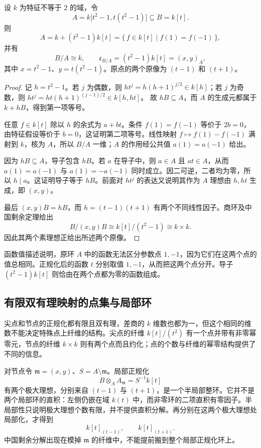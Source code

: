 \begin{proposition}\label{b3:prop:node-conductor}
	设 \(k\) 为特征不等于 \(2\) 的域，令
	\[
		A=k\bigl[t^2-1,t(t^2-1)\bigr]\subseteq B=k[t].
	\]
	则
	\[
		A=k+(t^2-1)k[t] =\bigl\{\,f\in k[t]\mid f(1)=f(-1)\,\bigr\},
	\]
	并有
	\[
		B/A\cong k,\qquad \mathfrak c_{B/A}=(t^2-1)k[t]=(x,y)_A,
	\]
	其中 \(x=t^2-1\)、\(y=t(t^2-1)\)。原点的两个原像为 \((t-1)\) 和 \((t+1)\)。
\end{proposition}
\begin{proof}
	记 \(h=t^2-1\)。若 \(j\) 为偶数，则 \(ht^j=h(h+1)^{j/2}\in k[h]\)；若 \(j\) 为奇数，则 \(ht^j=ht(h+1)^{(j-1)/2}\in k[h,ht]\)。 故 \(hB\subseteq A\)，而 \(A\) 的生成元都属于 \(k+hB\)，得到第一项等号。

	任意 \(f\in k[t]\) 除以 \(h\) 的余式为 \(a+bt\)。条件 \(f(1)=f(-1)\) 等价于 \(2b=0\)，由特征假设等价于 \(b=0\)，这证明第二项等号。线性映射 \(f\mapsto f(1)-f(-1)\) 满射到 \(k\)，核为 \(A\)，所以 \(B/A\) 一维；\(A\) 的作用经公共值 \(a(1)=a(-1)\) 给出。

	因为 \(hB\subseteq A\)，导子包含 \(hB\)。若 \(a\) 在导子中，则 \(a\in A\) 且 \(at\in A\)，从而 \(a(1)=a(-1)\) 与 \(a(1)=-a(-1)\) 同时成立。因二可逆，二者均为零，所以 \(h\mid a\)。这证明导子等于 \(hB\)。前面对 \(ht^j\) 的表达又说明其作为 \(A\) 理想由 \(h,ht\) 生成，即 \((x,y)\)。

	最后 \((x,y)B=hB\)，而 \(h=(t-1)(t+1)\) 有两个不同线性因子。商环及中国剩余定理给出
	\[
		B/(x,y)B\cong k[t]/(t^2-1)\cong k\times k.
	\]
	因此其两个素理想正给出所述两个原像。
\end{proof}

函数值描述说明，原环 \(A\) 中的函数无法区分参数点 \(1,-1\)，因为它们在这两个点的值总相同。正规化后的函数 \(t\) 分别取值 \(1,-1\)，从而把这两个点分开。导子 \((t^2-1)k[t]\) 则恰由在两个点都为零的函数组成。

\subsection{有限双有理映射的点集与局部环}\label{b3:subsec:0606:04}

尖点和节点的正规化都有限且双有理，差商的 \(k\) 维数也都为一，但这个相同的维数不能决定特殊点上纤维的结构。尖点的纤维 \(k[t]/(t^2)\) 有一个点并带有非零幂零元，节点的纤维 \(k\times k\) 则有两个点而且约化；点的个数与纤维的幂零结构提供了不同的信息。

\ProseParagraphBreak
对节点令 \(\mathfrak m=(x,y)\)、\(S=A\setminus\mathfrak m\)。局部正规化
\[
	B\otimes_AA_{\mathfrak m}=S^{-1}k[t]
\]
有两个极大理想，分别来自 \((t-1)\) 与 \((t+1)\)，是一个半局部整环。它并不是两个局部环的直积：左侧仍嵌在域 \(k(t)\) 中，而非零环的二项直积有零因子。半局部性只说明极大理想个数有限，并不提供直积分解。再分别在这两个极大理想处局部化，才得到
\[
	k[t]_{(t-1)},\qquad k[t]_{(t+1)}.
\]
中国剩余分解出现在模掉 \(\mathfrak m\) 的纤维中，不能提前搬到整个局部正规化环上。

